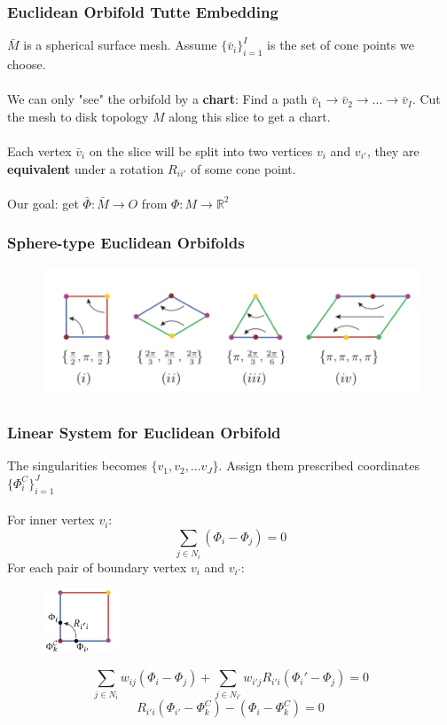 \documentclass{beamer}
\begin{document}
\begin{frame}
\frametitle{Euclidean Orbifold Tutte Embedding}
$\bar{M}$ is a spherical surface mesh. Assume $\{\bar{v}_i\}_{i = 1}^I$ is the set of cone points we choose. \\
~\\
We can only "see" the orbifold by a \textbf{chart}:
Find a path $\bar{v}_1\rightarrow \bar{v}_2\rightarrow ...\rightarrow \bar{v}_I $. Cut the mesh to disk topology $M$ along this slice to get a chart.\\
~\\
Each vertex $\bar{v}_i$ on the slice will be split into two vertices $v_i$ and $v_{i'}$, they are \textbf{equivalent} under a rotation $R_{ii'}$ of some cone point.\\
~\\
Our goal: get $\bar{\Phi}: \bar{M}\rightarrow \mathit{O}$ from $\Phi: M\rightarrow \mathbb{R}^2$
\end{frame}

\begin{frame}
\frametitle{Sphere-type Euclidean Orbifolds}
\begin{figure}
\includegraphics[width=\textwidth]{images/orbifolds}
\end{figure}
\end{frame}

\begin{frame}
\frametitle{Linear System for Euclidean Orbifold}
The singularities becomes $\{v_1, v_2, ... v_J\}$. Assign them prescribed coordinates $\{\Phi_i^C\}_{i=1}^{J}$\\
~\\
For inner vertex $v_i$:
$$\sum_{j\in N_i}(\Phi_i - \Phi_j) = 0$$
For each pair of boundary vertex $v_i$ and $v_{i'}$:
\begin{figure}
\includegraphics[width=0.2\textwidth]{images/linear-system}
\end{figure}
$$\sum_{j\in N_i}w_{ij}(\Phi_i - \Phi_j) + \sum_{j\in N_{i'}}w_{i'j}R_{i'i}(\Phi_i' - \Phi_j) = 0 $$
$$R_{i'i}(\Phi_{i'} - \Phi_k^C) - (\Phi_i - \Phi_k^C)= 0$$
\end{frame}
\end{document}
